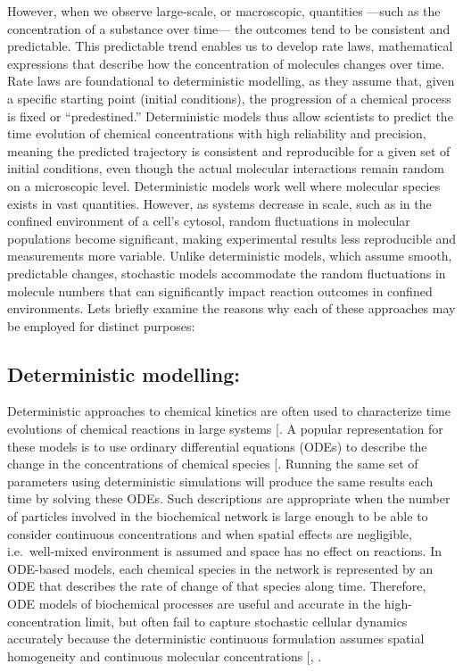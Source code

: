 \documentclass[
  11pt,
  letterpaper,
]{scrreprt}
\begin{document}
However, when we observe large-scale, or macroscopic, quantities ---such
as the concentration of a substance over time--- the outcomes tend to be
consistent and predictable. This predictable trend enables us to develop
rate laws, mathematical expressions that describe how the concentration
of molecules changes over time. Rate laws are foundational to
deterministic modelling, as they assume that, given a specific starting
point (initial conditions), the progression of a chemical process is
fixed or ``predestined.'' Deterministic models thus allow scientists to
predict the time evolution of chemical concentrations with high
reliability and precision, meaning the predicted trajectory is
consistent and reproducible for a given set of initial conditions, even
though the actual molecular interactions remain random on a microscopic
level. Deterministic models work well where molecular species exists in
vast quantities. However, as systems decrease in scale, such as in the
confined environment of a cell's cytosol, random fluctuations in
molecular populations become significant, making experimental results
less reproducible and measurements more variable. Unlike deterministic
models, which assume smooth, predictable changes, stochastic models
accommodate the random fluctuations in molecule numbers that can
significantly impact reaction outcomes in confined environments. Lets
briefly examine the reasons why each of these approaches may be employed
for distinct purposes:

\subsection*{Deterministic modelling:}\label{deterministic-modelling}

Deterministic approaches to chemical kinetics are often used to
characterize time evolutions of chemical reactions in large systems
{[}\citeproc{ref-marin2019Kinetics}{272}{]}. A popular representation
for these models is to use ordinary differential equations (ODEs) to
describe the change in the concentrations of chemical species
{[}\citeproc{ref-hoops2016Chapter}{273}{]}. Running the same set of
parameters using deterministic simulations will produce the same results
each time by solving these ODEs. Such descriptions are appropriate when
the number of particles involved in the biochemical network is large
enough to be able to consider continuous concentrations and when spatial
effects are negligible, i.e.~well-mixed environment is assumed and space
has no effect on reactions. In ODE-based models, each chemical species
in the network is represented by an ODE that describes the rate of
change of that species along time. Therefore, ODE models of biochemical
processes are useful and accurate in the high-concentration limit, but
often fail to capture stochastic cellular dynamics accurately because
the deterministic continuous formulation assumes spatial homogeneity and
continuous molecular concentrations
{[},
\citeproc{ref-smith2019Spatial}{275}{]}.
\end{document}
